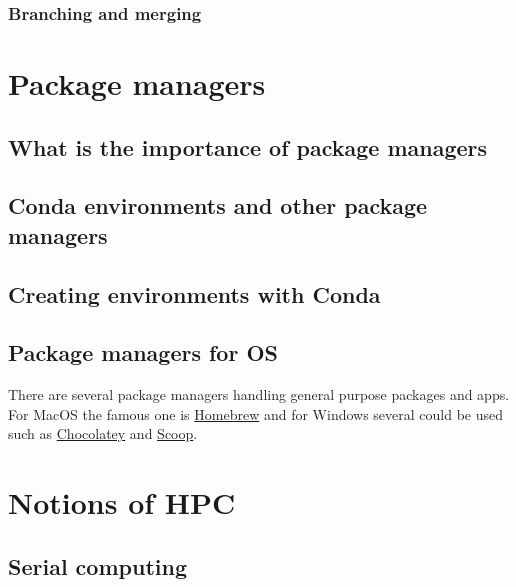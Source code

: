 \documentclass[
  letterpaper,
  DIV=11,
  numbers=noendperiod,
  oneside]{scrreprt}
\begin{document}
\hypertarget{branching-and-merging}{%
\subsection{Branching and merging}\label{branching-and-merging}}

\hypertarget{sec-managers}{%
\chapter{Package managers}\label{sec-managers}}

\hypertarget{what-is-the-importance-of-package-managers}{%
\section{What is the importance of package
managers}\label{what-is-the-importance-of-package-managers}}

\hypertarget{conda-environments-and-other-package-managers}{%
\section{Conda environments and other package
managers}\label{conda-environments-and-other-package-managers}}

\hypertarget{creating-environments-with-conda}{%
\section{Creating environments with
Conda}\label{creating-environments-with-conda}}

\hypertarget{package-managers-for-os}{%
\section{Package managers for OS}\label{package-managers-for-os}}

There are several package managers handling general purpose packages and
apps. For MacOS the famous one is \href{}{Homebrew} and for Windows
several could be used such as \href{}{Chocolatey} and
\href{https://scoop.sh/}{Scoop}.

\hypertarget{sec-hpc}{%
\chapter{Notions of HPC}\label{sec-hpc}}

\hypertarget{serial-computing}{%
\section{Serial computing}\label{serial-computing}}
\end{document}
